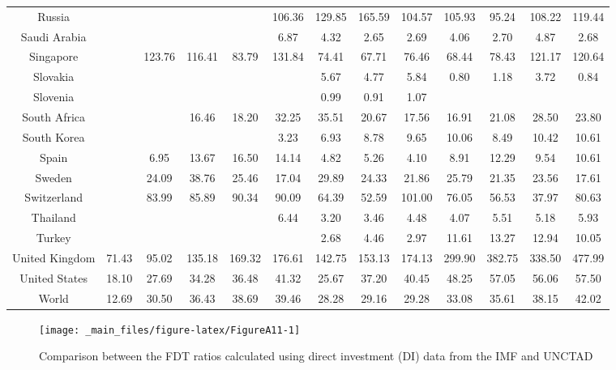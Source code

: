 \documentclass[a4paper, twoside]{templates/ociamthesis}
\begin{document}
\begin{table}
{\begin{tabular}[t]{ccccccccccccc}
Russia &  &  &  &  & 106.36 & 129.85 & 165.59 & 104.57 & 105.93 & 95.24 & 108.22 & 119.44\\
Saudi Arabia &  &  &  &  & 6.87 & 4.32 & 2.65 & 2.69 & 4.06 & 2.70 & 4.87 & 2.68\\
Singapore &  & 123.76 & 116.41 & 83.79 & 131.84 & 74.41 & 67.71 & 76.46 & 68.44 & 78.43 & 121.17 & 120.64\\
Slovakia &  &  &  &  &  & 5.67 & 4.77 & 5.84 & 0.80 & 1.18 & 3.72 & 0.84\\
Slovenia &  &  &  &  &  & 0.99 & 0.91 & 1.07 &  &  &  & \\
South Africa &  &  & 16.46 & 18.20 & 32.25 & 35.51 & 20.67 & 17.56 & 16.91 & 21.08 & 28.50 & 23.80\\
South Korea &  &  &  &  & 3.23 & 6.93 & 8.78 & 9.65 & 10.06 & 8.49 & 10.42 & 10.61\\
Spain &  & 6.95 & 13.67 & 16.50 & 14.14 & 4.82 & 5.26 & 4.10 & 8.91 & 12.29 & 9.54 & 10.61\\
Sweden &  & 24.09 & 38.76 & 25.46 & 17.04 & 29.89 & 24.33 & 21.86 & 25.79 & 21.35 & 23.56 & 17.61\\
Switzerland &  & 83.99 & 85.89 & 90.34 & 90.09 & 64.39 & 52.59 & 101.00 & 76.05 & 56.53 & 37.97 & 80.63\\
Thailand &  &  &  &  & 6.44 & 3.20 & 3.46 & 4.48 & 4.07 & 5.51 & 5.18 & 5.93\\
Turkey &  &  &  &  &  & 2.68 & 4.46 & 2.97 & 11.61 & 13.27 & 12.94 & 10.05\\
United Kingdom & 71.43 & 95.02 & 135.18 & 169.32 & 176.61 & 142.75 & 153.13 & 174.13 & 299.90 & 382.75 & 338.50 & 477.99\\
United States & 18.10 & 27.69 & 34.28 & 36.48 & 41.32 & 25.67 & 37.20 & 40.45 & 48.25 & 57.05 & 56.06 & 57.50\\
World & 12.69 & 30.50 & 36.43 & 38.69 & 39.46 & 28.28 & 29.16 & 29.28 & 33.08 & 35.61 & 38.15 & 42.02\\
\bottomrule
\end{tabular}}
\end{table}

\clearpage

\begin{figure}[!ht]

{\centering \texttt{[image: \_main\_files/figure-latex/FigureA11-1]} 

}

\caption{Comparison between the FDT ratios calculated using direct investment (DI) data from the IMF and UNCTAD}\label{fig:FigureA11}
\end{figure}
\end{document}
